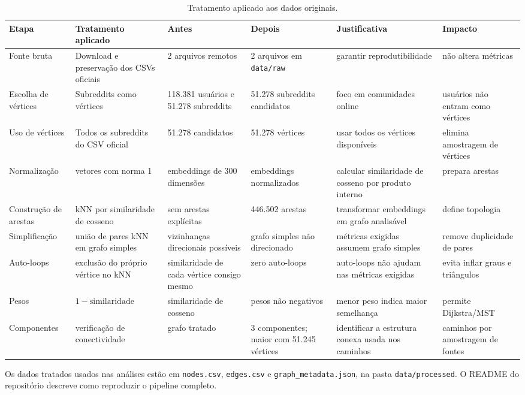 \documentclass[sigconf]{webmedia}
\begin{document}
\begin{table}
  \caption{Tratamento aplicado aos dados originais.}
  \label{tab:tratamento}
  \begin{tabular}{@{}p{}p{}p{}p{}p{}p{}@{}}
    \toprule
    Etapa & Tratamento aplicado & Antes & Depois & Justificativa & Impacto \\
    \midrule
    Fonte bruta & Download e preservação dos CSVs oficiais & 2 arquivos remotos & 2 arquivos em \texttt{data/raw} & garantir reprodutibilidade & não altera métricas \\
    Escolha de vértices & Subreddits como vértices & 118.381 usuários e 51.278 subreddits & 51.278 subreddits candidatos & foco em comunidades online & usuários não entram como vértices \\
    Uso de vértices & Todos os subreddits do CSV oficial & 51.278 candidatos & 51.278 vértices & usar todos os vértices disponíveis & elimina amostragem de vértices \\
    Normalização & vetores com norma 1 & embeddings de 300 dimensões & embeddings normalizados & calcular similaridade de cosseno por produto interno & prepara arestas \\
    Construção de arestas & kNN por similaridade de cosseno & sem arestas explícitas & 446.502 arestas & transformar embeddings em grafo analisável & define topologia \\
    Simplificação & união de pares kNN em grafo simples & vizinhanças direcionais possíveis & grafo simples não direcionado & métricas exigidas assumem grafo simples & remove duplicidade de pares \\
    Auto-loops & exclusão do próprio vértice no kNN & similaridade de cada vértice consigo mesmo & zero auto-loops & auto-loops não ajudam nas métricas exigidas & evita inflar graus e triângulos \\
    Pesos & $1-\mathrm{similaridade}$ & similaridade de cosseno & pesos não negativos & menor peso indica maior semelhança & permite Dijkstra/MST \\
    Componentes & verificação de conectividade & grafo tratado & 3 componentes; maior com 51.245 vértices & identificar a estrutura conexa usada nos caminhos & caminhos por amostragem de fontes \\
    \bottomrule
  \end{tabular}
\end{table}

Os dados tratados usados nas análises estão em
\texttt{nodes.csv}, \texttt{edges.csv} e
\texttt{graph\_metadata.json}, na pasta \texttt{data/processed}. O README do repositório
descreve como reproduzir o pipeline completo.
\end{document}
